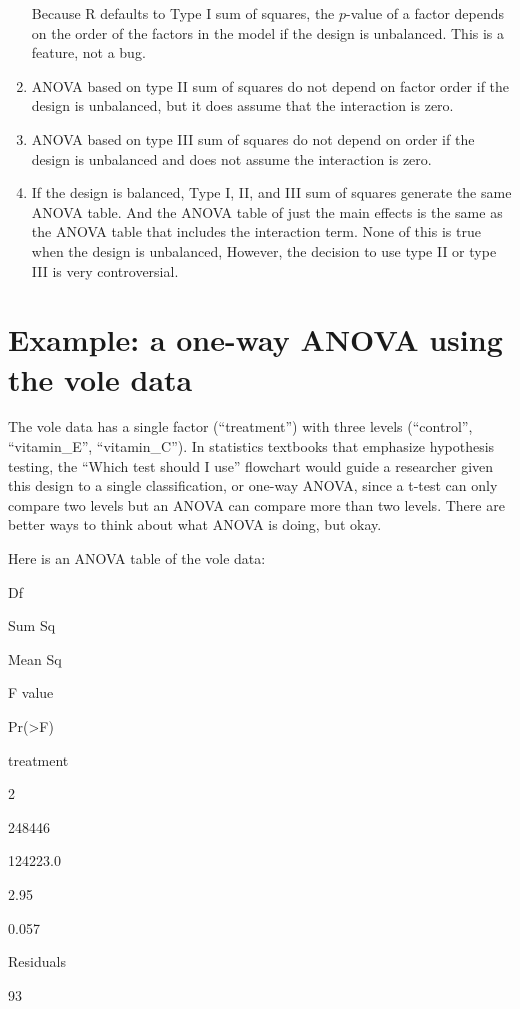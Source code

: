 \documentclass[]{book}
\begin{document}
\begin{enumerate}
  Because R defaults to Type I sum of squares, the \(p\)-value of a factor depends on the order of the factors in the model if the design is unbalanced. This is a feature, not a bug.
\item
  ANOVA based on type II sum of squares do not depend on factor order if the design is unbalanced, but it does assume that the interaction is zero.
\item
  ANOVA based on type III sum of squares do not depend on order if the design is unbalanced and does not assume the interaction is zero.
\item
  If the design is balanced, Type I, II, and III sum of squares generate the same ANOVA table. And the ANOVA table of just the main effects is the same as the ANOVA table that includes the interaction term. None of this is true when the design is unbalanced, However, the decision to use type II or type III is very controversial.
\end{enumerate}

\hypertarget{example-a-one-way-anova-using-the-vole-data}{%
\section{Example: a one-way ANOVA using the vole data}\label{example-a-one-way-anova-using-the-vole-data}}

The vole data has a single factor (``treatment'') with three levels (``control'', ``vitamin\_E'', ``vitamin\_C''). In statistics textbooks that emphasize hypothesis testing, the ``Which test should I use'' flowchart would guide a researcher given this design to a single classification, or one-way ANOVA, since a t-test can only compare two levels but an ANOVA can compare more than two levels. There are better ways to think about what ANOVA is doing, but okay.

Here is an ANOVA table of the vole data:

Df

Sum Sq

Mean Sq

F value

Pr(\textgreater F)

treatment

2

248446

124223.0

2.95

0.057

Residuals

93
\end{document}
